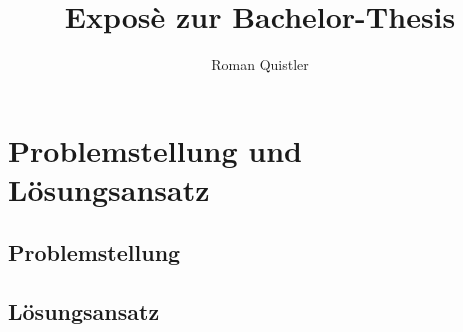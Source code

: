 \documentclass[a4paper, 11pt]{scrartcl}
\title{Exposè zur Bachelor-Thesis}
\author{Roman Quistler}
\begin{document}
	
	
	
	\newpage
	\tableofcontents
	\newpage
	
	
	
	\section{Problemstellung und Lösungsansatz}
	\label{sec:problemstellung-lösungsansatz}
	
	\subsection{Problemstellung}
	
	\subsection{Lösungsansatz}
	
	\newpage
	
	\begin{appendix}
		\listoffigures
	\end{appendix}
	
	\printbibliography
	
\end{document}

